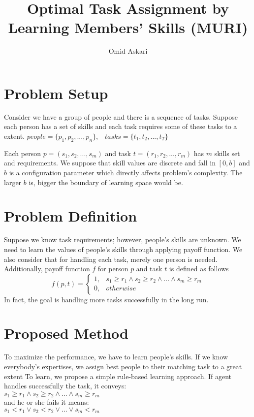 \documentclass[]{article}
\title{Optimal Task Assignment by Learning Members' Skills (MURI)}
\author{Omid Askari}
\begin{document}
\maketitle
\linenumbers
\setpagewiselinenumbers

\section{Problem Setup}
Consider we have a group of people and there is a sequence of tasks. Suppose each person has a set of skills and each task requires some of these tasks to a extent.\newline
$people = \{p_1, p_2, ..., p_n\}, \;\;\;    
tasks = \{t_1, t_2, ..., t_T\}$

Each person $p=(s_1, s_2, ..., s_m)$ and task $t=(r_1, r_2 , ..., r_m)$ has $m$ skills set and requirements. We suppose that skill values are discrete and fall in $[0, b]$ and $b$ is a configuration parameter which directly affects problem's complexity. The larger $b$ is, bigger the boundary of learning space would be. 

\section{Problem Definition}
Suppose we know task requirements; however, people's skills are unknown. We need to learn the values of people's skills through applying payoff function. We also consider that for handling each task, merely one person is needed. Additionally, payoff function $f$ for person $p$ and task $t$ is defined as follows
\begin{equation}
	f(p,t) = 
	\begin{cases}
		1,	& s_1 \geq r_1 \wedge s_2 \geq r_2 \wedge ... \wedge s_m \geq r_m\\
		0,	& otherwise
	\end{cases}
\end{equation}
In fact, the goal is handling more tasks successfully in the long run.

\section{Proposed Method}
To maximize the performance, we have to learn people's skills. If we know everybody's expertises, we assign best people to their matching task to a great extent
To learn, we propose a simple rule-based learning approach. If agent handles successfully the task, it conveys:\\
$s_1 \geq r_1 \wedge s_2 \geq r_2 \wedge ... \wedge s_m \geq r_m$\\
and he or she fails it means:\\
$s_1 < r_1 \vee s_2 < r_2 \vee ... \vee s_m < r_m$
\end{document}
